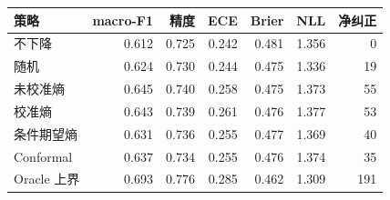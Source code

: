 \begin{tabular}{lrrrrrr}
\hline
策略 & macro-F1 & 精度 & ECE & Brier & NLL & 净纠正 \\
\hline
不下降 & 0.612 & 0.725 & 0.242 & 0.481 & 1.356 & 0 \\
随机 & 0.624 & 0.730 & 0.244 & 0.475 & 1.336 & 19 \\
未校准熵 & 0.645 & 0.740 & 0.258 & 0.475 & 1.373 & 55 \\
校准熵 & 0.643 & 0.739 & 0.261 & 0.476 & 1.377 & 53 \\
条件期望熵 & 0.631 & 0.736 & 0.255 & 0.477 & 1.369 & 40 \\
Conformal & 0.637 & 0.734 & 0.255 & 0.476 & 1.374 & 35 \\
Oracle 上界 & 0.693 & 0.776 & 0.285 & 0.462 & 1.309 & 191 \\
\hline
\end{tabular}
